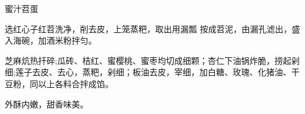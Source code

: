 \begin{recipe}[八宝苕蛋]{蜜汁苕蛋}

\ingredients


\cooking

选红心子红苕洗净，削去皮，上笼蒸粑，取出用漏瓢 按成苕泥，由漏孔滤出，盛入海碗，加酒米粉拌匀。

\step 芝麻炕热扦碎;瓜砖、桔红、蜜樱桃、蜜枣均切成细颗；杏仁下油锅炸脆，捞起剁细;莲子去皮、去心，蒸粑，剁细；板油去皮，宰细，加白糖、玫瑰、化猪油、干豆粉，同以上各料合拌成馅。

\notes

外酥内嫩，甜香味美。

\end{recipe}

